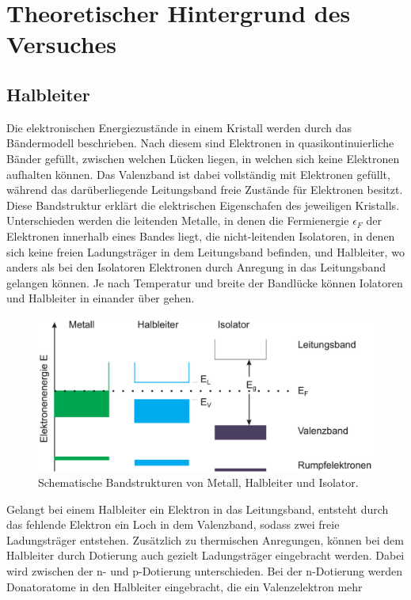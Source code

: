 \section{Theoretischer Hintergrund des Versuches}
\label{sec:Theorie}
\subsection{Halbleiter}
\label{sec:Halbleiter}
Die elektronischen Energiezustände in einem Kristall werden durch das Bändermodell beschrieben. Nach diesem sind Elektronen in quasikontinuierliche
Bänder gefüllt, zwischen welchen Lücken liegen, in welchen sich keine Elektronen aufhalten können. Das Valenzband ist dabei vollständig mit Elektronen
gefüllt, während das darüberliegende Leitungsband freie Zustände für Elektronen besitzt. Diese Bandstruktur erklärt die elektrischen Eigenschafen
des jeweiligen Kristalls. Unterschieden werden die leitenden Metalle, in denen die Fermienergie $\epsilon_F$ der Elektronen innerhalb eines Bandes liegt,
die nicht-leitenden Isolatoren, in denen sich keine freien Ladungsträger in dem Leitungsband befinden, und Halbleiter, wo anders als bei den Isolatoren
Elektronen durch Anregung in das Leitungsband gelangen können. Je nach Temperatur und breite der Bandlücke können Iolatoren und Halbleiter in einander 
über gehen. 
\begin{figure}[H]
    \centering
    \includegraphics[scale=0.4]{pictures/Bandstrukturen.png}
    \caption{Schematische Bandstrukturen von Metall, Halbleiter und Isolator. \cite{Halbleiter-Grundlagen}}
\end{figure}
\noindent
Gelangt bei einem Halbleiter ein Elektron in das Leitungsband, entsteht durch das fehlende Elektron ein Loch in dem Valenzband, sodass zwei freie 
Ladungsträger entstehen. Zusätzlich zu thermischen Anregungen, können bei dem Halbleiter durch Dotierung auch gezielt Ladungsträger eingebracht werden.
Dabei wird zwischen der n- und p-Dotierung unterschieden. Bei der n-Dotierung werden Donatoratome in den Halbleiter eingebracht, die ein Valenzelektron mehr
